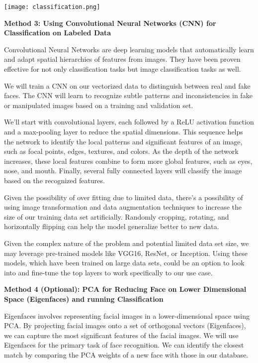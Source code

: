 \documentclass{article}
\begin{document}
\begin{titlepage}
\begin{itemize}
\begin{center}
\texttt{[image: classification.png]}
\end{center}

    \textbf{Method 3: Using Convolutional Neural Networks (CNN) for Classification on Labeled Data}

    Convolutional Neural Networks are deep learning models that automatically learn and adapt spatial hierarchies of features from images. They have been proven effective for not only classification tasks but image classification tasks as well.
     
    We will train a CNN on our vectorized data to distinguish between real and fake faces. The CNN will learn to recognize subtle patterns and inconsistencies in fake or manipulated images based on a training and validation set.

    We'll start with convolutional layers, each followed by a ReLU activation function and a max-pooling layer to reduce the spatial dimensions. This sequence helps the network to identify the local patterns and significant features of an image, such as focal points, edges, textures, and colors. As the depth of the network increases, these local features combine to form more global features, such as eyes, nose, and mouth. Finally, several fully connected layers will classify the image based on the recognized features.

    Given the possibility of over fitting due to limited data, there's a possibility of using image transformation and data augmentation techniques to increase the size of our training data set artificially. Randomly cropping, rotating, and horizontally flipping can help the model generalize better to new data.

    Given the complex nature of the problem and potential limited data set size, we may leverage pre-trained models like VGG16, ResNet, or Inception. Using these models, which have been trained on large data sets, could be an option to look into and fine-tune the top layers to work specifically to our use case.

    \textbf{Method 4 (Optional): PCA for Reducing Face on Lower Dimensional Space (Eigenfaces) and running Classification}

    Eigenfaces involves representing facial images in a lower-dimensional space using PCA. By projecting facial images onto a set of orthogonal vectors (Eigenfaces), we can capture the most significant features of the facial images. We will use Eigenfaces for the primary task of face recognition. We can identify the closest match by comparing the PCA weights of a new face with those in our database.


\end{itemize}
\end{titlepage}
\end{document}
